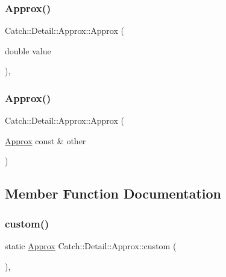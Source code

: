 \subsubsection{\texorpdfstring{Approx()}{Approx()}\hspace{0.1cm}{\footnotesize\ttfamily [1/2]}}
{\footnotesize\ttfamily Catch\+::\+Detail\+::\+Approx\+::\+Approx (\begin{DoxyParamCaption}\item[{double}]{value }\end{DoxyParamCaption})\hspace{0.3cm}{\ttfamily [inline]}, {\ttfamily [explicit]}}

\mbox{\label{class_catch_1_1_detail_1_1_approx_a807330c63266fc914abdf6e461255a54}} 
\subsubsection{\texorpdfstring{Approx()}{Approx()}\hspace{0.1cm}{\footnotesize\ttfamily [2/2]}}
{\footnotesize\ttfamily Catch\+::\+Detail\+::\+Approx\+::\+Approx (\begin{DoxyParamCaption}\item[{\hyperlink{class_catch_1_1_detail_1_1_approx}{Approx} const \&}]{other }\end{DoxyParamCaption})\hspace{0.3cm}{\ttfamily [inline]}}



\subsection{Member Function Documentation}
\mbox{\label{class_catch_1_1_detail_1_1_approx_aaf86dc0ee92272ac2d9839197a07951d}} 
\subsubsection{\texorpdfstring{custom()}{custom()}}
{\footnotesize\ttfamily static \hyperlink{class_catch_1_1_detail_1_1_approx}{Approx} Catch\+::\+Detail\+::\+Approx\+::custom (\begin{DoxyParamCaption}{ }\end{DoxyParamCaption})\hspace{0.3cm}{\ttfamily [inline]}, {\ttfamily [static]}}

